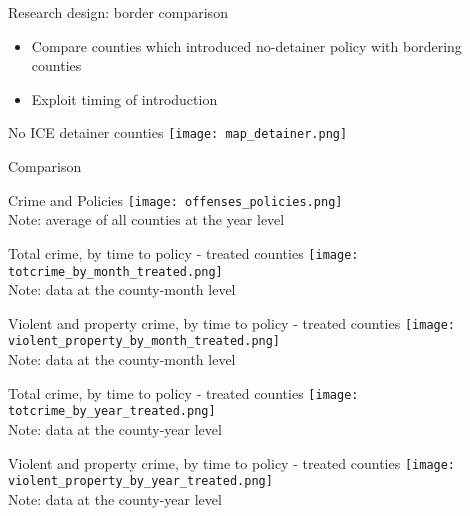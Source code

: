 \documentclass[xcolor=pdftex,dvipsnames,table]{beamer}
\newcommand{\tablesfolder}{/Users/barbarabiasi/Dropbox/Research/sanctuaries/out}
\begin{document}
\begin{frame}{Research design: border comparison}
\begin{itemize}
\item Compare counties which introduced no-detainer policy with bordering counties
\item Exploit timing of introduction
\end{itemize}
\end{frame}

\begin{frame}{No ICE detainer counties}
\texttt{[image: map\_detainer.png]}
\end{frame}

\begin{frame}{Comparison}
\tiny

\end{frame}

\begin{frame}{Crime and Policies}
\texttt{[image: offenses\_policies.png]}\\
\tiny{Note: average of all counties at the year level}
\end{frame}

\begin{frame}{Total crime, by time to policy - treated counties}
\texttt{[image: totcrime\_by\_month\_treated.png]}\\
\tiny{Note: data at the county-month level}
\end{frame}

\begin{frame}{Violent and property crime, by time to policy - treated counties}
\texttt{[image: violent\_property\_by\_month\_treated.png]}\\
\tiny{Note: data at the county-month level}
\end{frame}


\begin{frame}{Total crime, by time to policy - treated counties}
\texttt{[image: totcrime\_by\_year\_treated.png]}\\
\tiny{Note: data at the county-year level}
\end{frame}

\begin{frame}{Violent and property crime, by time to policy - treated counties}
\texttt{[image: violent\_property\_by\_year\_treated.png]}\\
\tiny{Note: data at the county-year level}
\end{frame}
\end{document}
